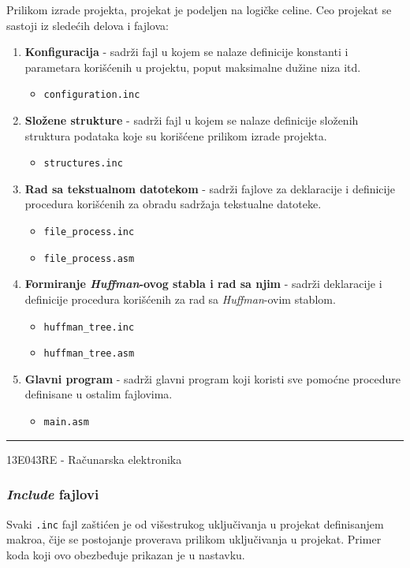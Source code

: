 \documentclass[a4paper, 12pt]{article}
\newcommand{\btmline}{
\vfill
\rule{0.9\textwidth}{0.4mm}
\begin{center}
13E043RE - Računarska elektronika
\end{center}}
\begin{document}
Prilikom izrade projekta, projekat je podeljen na logičke celine. Ceo projekat se sastoji iz sledećih delova i fajlova:

\begin{enumerate}
\item \textbf{Konfiguracija} - sadrži fajl u kojem se nalaze definicije konstanti i parametara korišćenih u projektu, poput maksimalne dužine niza itd.
	\begin{itemize}
	\item \verb|configuration.inc|
	\end{itemize}
	\item \textbf{Složene strukture} - sadrži fajl u kojem se nalaze definicije složenih struktura podataka koje su korišćene prilikom izrade projekta.
	\begin{itemize}
	\item \verb|structures.inc|
	\end{itemize}
\item \textbf{Rad sa tekstualnom datotekom} - sadrži fajlove za deklaracije i definicije procedura korišćenih za obradu sadržaja tekstualne datoteke.
	\begin{itemize}
	\item \verb|file_process.inc|
	\item \verb|file_process.asm|
	\end{itemize}
\item \textbf{Formiranje \textit{Huffman}-ovog stabla i rad sa njim} - sadrži deklaracije i definicije procedura korišćenih za rad sa \textit{Huffman}-ovim stablom.
	\begin{itemize}
	\item \verb|huffman_tree.inc|
	\item \verb|huffman_tree.asm|
	\end{itemize}
\item \textbf{Glavni program} - sadrži glavni program koji koristi sve pomoćne procedure definisane u ostalim fajlovima.
	\begin{itemize}
	\item \verb|main.asm|
	\end{itemize}
\end{enumerate}

\btmline\newpage

\subsubsection*{\textit{Include} fajlovi}
Svaki \verb|.inc| fajl zaštićen je od višestrukog uključivanja u projekat definisanjem makroa, čije se postojanje proverava prilikom uključivanja u projekat.
Primer koda koji ovo obezbeđuje prikazan je u nastavku.
\end{document}
